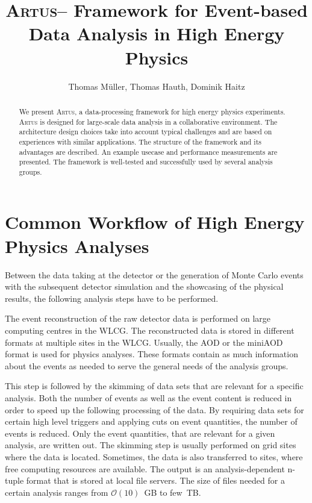 \documentclass[3p]{elsarticle}
\newcommand{\software}[1]{\textsc{#1}\xspace}
\newcommand{\artus}{\software{Artus}}
\begin{document}
\begin{frontmatter}
\title{\artus -- Framework for Event-based Data Analysis in High Energy Physics}

\author[kit]{Thomas M\"uller, Thomas Hauth, Dominik Haitz}
\address[kit]{Karlsruhe Institute of Technology, Wolfgang-Gaede-Stra\ss{}e 1, D-76131 Karlsruhe}

\begin{abstract}
We present \artus, a data-processing framework for high energy physics experiments. \artus is designed for large-scale data analysis in a collaborative environment.
The architecture design choices take into account typical challenges and are based on experiences with similar applications.
The structure of the framework and its advantages are described.
An example usecase and performance measurements are presented.
The framework is well-tested and successfully used by several analysis groups.

\end{abstract}

\end{frontmatter}


\section{Common Workflow of High Energy Physics Analyses \label{section_artus_analysis_workflow}}

Between the data taking at the detector or the generation of Monte Carlo events with the subsequent detector simulation and the showcasing of the physical results, the following analysis steps have to be performed.

The event reconstruction of the raw detector data is performed on large computing centres in the WLCG. The reconstructed data is stored in different formats at multiple sites in the WLCG. Usually, the AOD or the miniAOD format is used for physics analyses. These formats contain as much information about the events as needed to serve the general needs of the analysis groups.

This step is followed by the skimming of data sets that are relevant for a specific analysis. Both the number of events as well as the event content is reduced in order to speed up the following processing of the data. By requiring data sets for certain high level triggers and applying cuts on event quantities, the number of events is reduced. Only the event quantities, that are relevant for a given analysis, are written out. The skimming step is usually performed on grid sites where the data is located. Sometimes, the data is also transferred to sites, where free computing resources are available. The output is an analysis-dependent n-tuple format that is stored at local file servers. The size of files needed for a certain analysis ranges from $\mathcal O(10)$~GB to few~TB.
\end{document}
